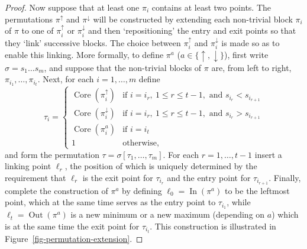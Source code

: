 \documentclass[11pt]{article}
\begin{document}
\begin{proof}
Now suppose that at least one $\pi_i$ contains at least two points.
The permutations $\pi^\uparrow$ and $\pi^\downarrow$ will be constructed by extending
each non-trivial block $\pi_i$ of $\pi$ to one of $\pi_i^\uparrow$ or $\pi_i^\downarrow$ and then `repositioning' the entry and exit points so that they `link' successive blocks.
The choice between $\pi_i^\uparrow$ and $\pi_i^\downarrow$ is made so as to enable this linking.
More formally, to define $\pi^a$ ($a\in\{\uparrow,\downarrow\}$), first write $\sigma=s_1\ldots s_m$,
and suppose that the non-trivial blocks of $\pi$ are, from left to right, $\pi_{i_1},\ldots,\pi_{i_t}$.
Next, for each $i=1,\ldots,m$ define
\[
\tau_i=\left\{ \begin{array}{ll}
{\operatorname{Core}}(\pi_i^\uparrow) & \mbox{if } i=i_r,\ 1\leq r\leq t-1, \mbox{ and } s_{i_r}<s_{i_{r+1}}\\
{\operatorname{Core}}(\pi_i^\downarrow) & \mbox{if } i=i_r,\ 1\leq r\leq t-1, \mbox{ and } s_{i_r}>s_{i_{r+1}}\\
{\operatorname{Core}}(\pi_i^a) & \mbox{if } i=i_t\\
1 & \mbox{otherwise,}
\end{array} \right.
\]
and form the permutation $\tau = \sigma[\tau_1,\ldots,\tau_m]$.
For each $r=1,\ldots ,t-1$ insert a linking point $\ell_r$, the position of which is uniquely determined by the requirement that $\ell_r$ is the exit point for $\tau_{i_r}$ and the entry point for $\tau_{i_{r+1}}$.
Finally, complete the construction of $\pi^a$ by defining $\ell_0={\operatorname{In}}(\pi^a)$ to be the leftmost point, which at the same time serves as the entry point to $\tau_{i_1}$, while $\ell_t={\operatorname{Out}}(\pi^a)$ is a new minimum or a new maximum (depending on $a$) which is at the same time the exit point for $\tau_{i_t}$.
This construction is illustrated in Figure~\ref{fig-permutation-extension}.


\end{proof}
\end{document}
